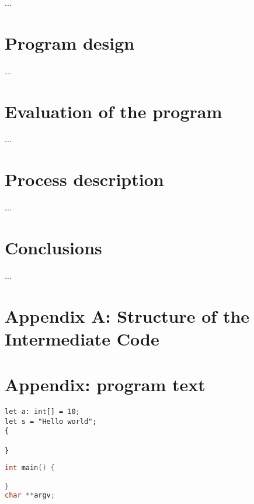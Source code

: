 \documentclass[a4paper]{article}
\begin{document}
...

\section*{Program design}

...

\section*{Evaluation of the program}

...

%

\section*{Process description}

...

\section*{Conclusions}

...

\section*{Appendix A: Structure of the Intermediate Code}
\label{appendix_a}

\section*{Appendix: program text}




\begin{lstlisting}[language=DPCC]
let a: int[] = 10;
let s = "Hello world";
{

}
\end{lstlisting}

\begin{lstlisting}[language=C]
int main() {

}
char **argv;
\end{lstlisting}
\end{document}
